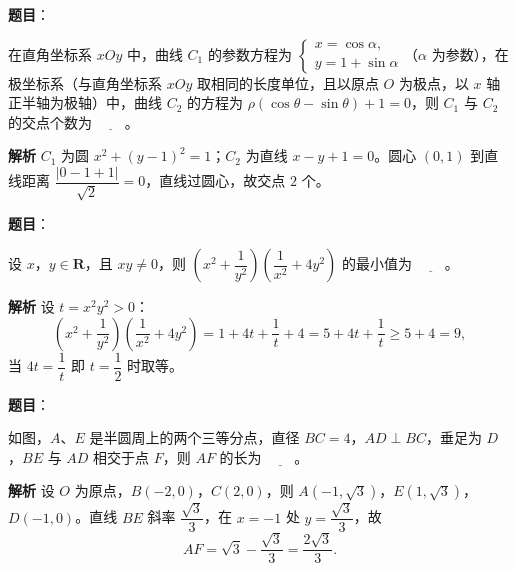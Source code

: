 \begin{answer}

\textbf{题目}：

在直角坐标系 $xOy$ 中，曲线 $C_1$ 的参数方程为 $\begin{cases}x=\cos\alpha,\\y=1+\sin\alpha\end{cases}$（$\alpha$ 为参数），在极坐标系（与直角坐标系 $xOy$ 取相同的长度单位，且以原点 $O$ 为极点，以 $x$ 轴正半轴为极轴）中，曲线 $C_2$ 的方程为 $\rho(\cos\theta-\sin\theta)+1=0$，则 $C_1$ 与 $C_2$ 的交点个数为 $\underline{\qquad}$。

\textbf{解析}
$C_1$ 为圆 $x^2+(y-1)^2=1$；$C_2$ 为直线 $x-y+1=0$。圆心 $(0,1)$ 到直线距离 $\dfrac{|0-1+1|}{\sqrt2}=0$，直线过圆心，故交点 $2$ 个。


\end{answer}
\begin{answer}

\textbf{题目}：

设 $x$，$y\in\mathbf R$，且 $xy\neq0$，则 $\left(x^2+\dfrac1{y^2}\right)\left(\dfrac1{x^2}+4y^2\right)$ 的最小值为 $\underline{\qquad}$。

\textbf{解析}
设 $t=x^2y^2>0$：
\nopagebreak[4]
\[\left(x^2+\frac1{y^2}\right)\left(\frac1{x^2}+4y^2\right)=1+4t+\frac1t+4=5+4t+\frac1t\geqslant5+4=9,\]
当 $4t=\dfrac1t$ 即 $t=\dfrac12$ 时取等。


\end{answer}
\begin{answer}

\textbf{题目}：

如图，$A$、$E$ 是半圆周上的两个三等分点，直径 $BC=4$，$AD\perp BC$，垂足为 $D$，$BE$ 与 $AD$ 相交于点 $F$，则 $AF$ 的长为 $\underline{\qquad}$。
\nopagebreak[4]
\begin{center}\end{center}
\nopagebreak[4]
\textbf{解析}
设 $O$ 为原点，$B(-2,0)$，$C(2,0)$，则 $A(-1,\sqrt3)$，$E(1,\sqrt3)$，$D(-1,0)$。直线 $BE$ 斜率 $\dfrac{\sqrt3}{3}$，在 $x=-1$ 处 $y=\dfrac{\sqrt3}3$，故
\nopagebreak[4]
\[AF=\sqrt3-\frac{\sqrt3}3=\frac{2\sqrt3}3.\]


\end{answer}
